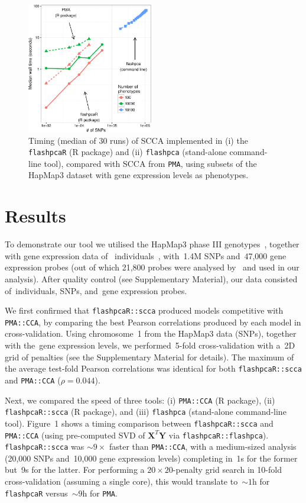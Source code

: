 \documentclass{bioinfo}
\begin{document}
\begin{figure}[!tpb]
\centerline{\includegraphics[width=0.49\textwidth]{scca_timing-crop.pdf}}
\caption{
Timing (median of 30 runs) of SCCA implemented in (i) the \texttt{flashpcaR}
(\textsf{R} package) and (ii) \texttt{flashpca} (stand-alone command-line tool),
compared with SCCA from \texttt{PMA}, using subsets of the HapMap3 dataset with gene
expression levels as phenotypes.
}
\label{fig:01}
\end{figure}

\section{Results}

To demonstrate our tool we utilised the HapMap3 phase III
genotypes~\citep{hapmap2010}, together with gene expression data of~\nindiv
individuals~\citep{Stranger2012}, with~1.4M SNPs and~47,000 gene expression
probes (out of which 21,800 probes were analysed by~\citet{Stranger2012} and
used in our analysis). After quality control (see Supplementary Material),
our data consisted of~\nindiv individuals, \nsnps SNPs, and~\ngenes gene
expression probes.

We first confirmed that \texttt{flashpcaR::scca} produced models competitive
with \texttt{PMA::CCA}, by comparing the best Pearson correlations produced
by each model in cross-validation.  Using chromosome~1 from the HapMap3
data (\nsnpschr SNPs), together with the~\ngenes gene expression levels,
we performed~5-fold cross-validation with a~2D grid of penalties (see the
Supplementary Material for details). The maximum of the average test-fold
Pearson correlations was identical for both \texttt{flashpcaR::scca} and
\texttt{PMA::CCA} ($\rho=0.044$).

Next, we compared the speed of three tools: (i) \texttt{PMA::CCA} (\textsf{R}
package), (ii) \texttt{flashpcaR::scca} (\textsf{R} package), and (iii)
\texttt{flashpca} (stand-alone command-line tool).
Figure~1\vphantom{\ref{fig:01}} shows a timing comparison between
\texttt{flashpcaR::scca} and \texttt{PMA::CCA} (using pre-computed SVD of
$\mathbf{X}^T \mathbf{Y}$ via \texttt{flashpcaR::flashpca}).
\texttt{flashpcaR::scca} was ${\sim}9\times$ faster than \texttt{PMA::CCA}, with
a medium-sized analysis (20,000 SNPs and~10,000 gene expression levels)
completing in~1s for the former but~9s for the latter.  For performing a
$20\times20$-penalty grid search in 10-fold cross-validation (assuming a single
core), this would translate to~${\sim}1$h for \texttt{flashpcaR}
versus~${\sim}9$h for \texttt{PMA}.
\end{document}
